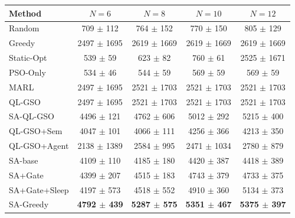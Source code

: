 \begin{tabular}{lcccc}
\toprule
Method & $N=6$ & $N=8$ & $N=10$ & $N=12$ \\
\midrule
Random & 709 $\pm$ 112 & 764 $\pm$ 152 & 770 $\pm$ 150 & 805 $\pm$ 129 \\
Greedy & 2497 $\pm$ 1695 & 2619 $\pm$ 1669 & 2619 $\pm$ 1669 & 2619 $\pm$ 1669 \\
Static-Opt & 539 $\pm$ 59 & 623 $\pm$ 82 & 760 $\pm$ 61 & 2525 $\pm$ 1671 \\
PSO-Only & 534 $\pm$ 46 & 544 $\pm$ 59 & 569 $\pm$ 59 & 569 $\pm$ 59 \\
MARL & 2497 $\pm$ 1695 & 2521 $\pm$ 1703 & 2521 $\pm$ 1703 & 2521 $\pm$ 1703 \\
QL-GSO & 2497 $\pm$ 1695 & 2521 $\pm$ 1703 & 2521 $\pm$ 1703 & 2521 $\pm$ 1703 \\
SA-QL-GSO & 4496 $\pm$ 121 & 4762 $\pm$ 606 & 5012 $\pm$ 292 & 5215 $\pm$ 400 \\
QL-GSO+Sem & 4047 $\pm$ 101 & 4066 $\pm$ 111 & 4256 $\pm$ 366 & 4213 $\pm$ 350 \\
QL-GSO+Agent & 2138 $\pm$ 1389 & 2584 $\pm$ 995 & 2471 $\pm$ 1034 & 2780 $\pm$ 879 \\
SA-base & 4109 $\pm$ 110 & 4185 $\pm$ 180 & 4420 $\pm$ 387 & 4418 $\pm$ 389 \\
SA+Gate & 4399 $\pm$ 207 & 4515 $\pm$ 183 & 4743 $\pm$ 379 & 4733 $\pm$ 375 \\
SA+Gate+Sleep & 4197 $\pm$ 573 & 4518 $\pm$ 552 & 4910 $\pm$ 360 & 5134 $\pm$ 373 \\
SA-Greedy & \textbf{4792 $\pm$ 439} & \textbf{5287 $\pm$ 575} & \textbf{5351 $\pm$ 467} & \textbf{5375 $\pm$ 397} \\
\bottomrule
\end{tabular}